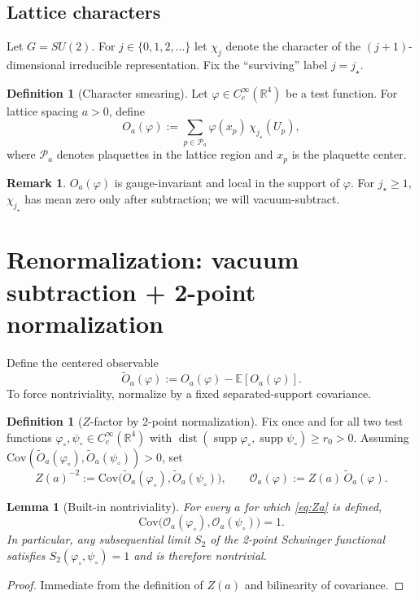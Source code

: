 \documentclass[11pt]{article}
\newtheorem{lemma}[theorem]{Lemma}
\theoremstyle{definition}
\newtheorem{definition}[theorem]{Definition}
\newtheorem{remark}[theorem]{Remark}
\newcommand{\E}{\mathbb{E}}
\newcommand{\Cov}{\mathrm{Cov}}
\newcommand{\1}{\mathbf{1}}
\newcommand{\dist}{\operatorname{dist}}
\newcommand{\supp}{\operatorname{supp}}
\begin{document}
\subsection{Lattice characters}
Let $G=SU(2)$. For $j\in\{0,1,2,\dots\}$ let $\chi_j$ denote the character of the $(j+1)$-dimensional irreducible representation. Fix the ``surviving'' label $j=j_\star$.

\begin{definition}[Character smearing]
Let $\varphi\in C_c^\infty(\mathbb R^4)$ be a test function. For lattice spacing $a>0$, define
\begin{equation}\label{eq:Oraw}
O_a(\varphi):=\sum_{p\in\mathcal P_a}\varphi(x_p)\,\chi_{j_\star}(U_p),
\end{equation}
where $\mathcal P_a$ denotes plaquettes in the lattice region and $x_p$ is the plaquette center.
\end{definition}

\begin{remark}
$O_a(\varphi)$ is gauge-invariant and local in the support of $\varphi$. For $j_\star\ge 1$, $\chi_{j_\star}$ has mean zero only after subtraction; we will vacuum-subtract.
\end{remark}

\section{Renormalization: vacuum subtraction + 2-point normalization}
Define the centered observable
\begin{equation}\label{eq:centered}
\widetilde O_a(\varphi):=O_a(\varphi)-\E[O_a(\varphi)].
\end{equation}
To force nontriviality, normalize by a fixed separated-support covariance.

\begin{definition}[$Z$-factor by 2-point normalization]
Fix once and for all two test functions $\varphi_\circ,\psi_\circ\in C_c^\infty(\mathbb R^4)$ with $\dist(\supp\varphi_\circ,\supp\psi_\circ)\ge r_0>0$.
Assuming $\Cov(\widetilde O_a(\varphi_\circ),\widetilde O_a(\psi_\circ))>0$, set
\begin{equation}\label{eq:Za}
Z(a)^{-2}:=\Cov\big(\widetilde O_a(\varphi_\circ),\widetilde O_a(\psi_\circ)\big),
\qquad \mathcal O_a(\varphi):=Z(a)\,\widetilde O_a(\varphi).
\end{equation}
\end{definition}

\begin{lemma}[Built-in nontriviality]\label{lem:builtinnontrivial}
For every $a$ for which \eqref{eq:Za} is defined,
\[
\Cov\big(\mathcal O_a(\varphi_\circ),\mathcal O_a(\psi_\circ)\big)=1.
\]
In particular, any subsequential limit $S_2$ of the 2-point Schwinger functional satisfies $S_2(\varphi_\circ,\psi_\circ)=1$ and is therefore nontrivial.
\end{lemma}
\begin{proof}
Immediate from the definition of $Z(a)$ and bilinearity of covariance.
\end{proof}
\end{document}
